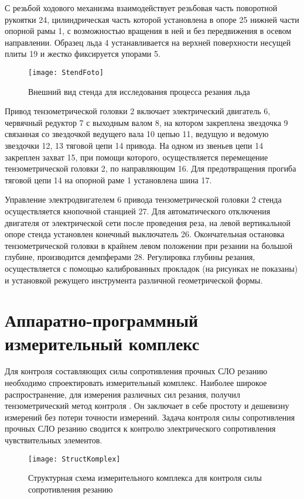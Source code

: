 С резьбой ходового механизма взаимодействует резьбовая часть поворотной рукоятки 24, цилиндрическая часть которой установлена в опоре 25 нижней части опорной рамы 1, с возможностью вращения в ней и без передвижения в осевом направлении. Образец льда 4 устанавливается на верхней поверхности несущей плиты 19 и жестко фиксируется упорами 5.

\begin{figure} [h]
	\center
	\texttt{[image: StendFoto]}
	\caption{Внешний вид стенда для исследования процесса резания льда} 
	\label{img:StendFoto}  
\end{figure}

Привод тензометрической головки 2 включает электрический двигатель 6, червячный редуктор 7 с выходным валом 8, на котором закреплена звездочка 9 связанная со звездочкой ведущего вала 10 цепью 11, ведущую и ведомую звездочки 12, 13 тяговой цепи 14 привода. На одном из звеньев цепи 14 закреплен захват 15, при помощи которого, осуществляется перемещение тензометрической головки 2, по направляющим 16. Для предотвращения прогиба тяговой цепи 14 на опорной раме 1 установлена шина 17.

Управление электродвигателем 6 привода тензометрической головки 2 стенда осуществляется кнопочной станцией 27. Для автоматического отключения двигателя от электрической сети после проведения реза, на левой вертикальной опоре стенда установлен конечный выключатель 26. Окончательная остановка тензометрической головки в крайнем левом положении при резании на большой глубине, производится демпферами 28. Регулировка глубины резания, осуществляется с помощью калиброванных прокладок (на рисунках не показаны) и установкой режущего инструмента различной геометрической формы.

\section{Аппаратно-программный измерительный комплекс}\label{sect2_4}

Для контроля составляющих силы сопротивления прочных СЛО резанию необходимо спроектировать измерительный комплекс. Наиболее широкое распространение, для измерения различных сил резания, получил тензометрический метод контроля \todo{[ссылки]}. Он заключает в себе простоту и дешевизну измерений без потери точности измерений. Задача контроля силы сопротивления прочных СЛО резанию сводится к контролю электрического сопротивления чувствительных элементов.

\begin{figure} [htbp]
	\center
	\texttt{[image: StructKomplex]}
	\caption{Структурная схема измерительного комплекса для контроля силы сопротивления резанию} 
	\label{img:StructKomplex}  
\end{figure}

